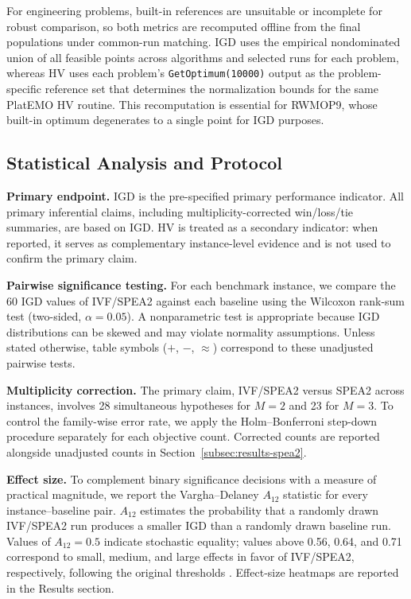 \documentclass[pdflatex,sn-mathphys-ay]{sn-jnl}%
\theoremstyle{thmstyleone}%
\theoremstyle{thmstyletwo}%
\theoremstyle{thmstylethree}%
\begin{document}
For engineering problems, built-in references are unsuitable or incomplete for robust comparison, so both metrics are recomputed offline from the final populations under common-run matching. IGD uses the empirical nondominated union of all feasible points across algorithms and selected runs for each problem, whereas HV uses each problem's \texttt{GetOptimum(10000)} output as the problem-specific reference set that determines the normalization bounds for the same PlatEMO HV routine. This recomputation is essential for RWMOP9, whose built-in optimum degenerates to a single point for IGD purposes.

\subsection{Statistical Analysis and Protocol}\label{subsec:stats}

\textbf{Primary endpoint.} IGD is the pre-specified primary performance indicator. All primary inferential claims, including multiplicity-corrected win/loss/tie summaries, are based on IGD. HV is treated as a secondary indicator: when reported, it serves as complementary instance-level evidence and is not used to confirm the primary claim.

\textbf{Pairwise significance testing.} For each benchmark instance, we compare the 60 IGD values of IVF/SPEA2 against each baseline using the Wilcoxon rank-sum test \citep{wilcoxon1945} (two-sided, $\alpha=0.05$). A nonparametric test is appropriate because IGD distributions can be skewed and may violate normality assumptions. Unless stated otherwise, table symbols ($+$, $-$, $\approx$) correspond to these unadjusted pairwise tests.

\textbf{Multiplicity correction.} The primary claim, IVF/SPEA2 versus SPEA2 across instances, involves 28 simultaneous hypotheses for $M=2$ and 23 for $M=3$. To control the family-wise error rate, we apply the Holm--Bonferroni step-down procedure \citep{holm1979simple} separately for each objective count. Corrected counts are reported alongside unadjusted counts in Section~\ref{subsec:results-spea2}.

\textbf{Effect size.} To complement binary significance decisions with a measure of practical magnitude, we report the Vargha--Delaney $A_{12}$ statistic \citep{vargha2000critique} for every instance--baseline pair. $A_{12}$ estimates the probability that a randomly drawn IVF/SPEA2 run produces a smaller IGD than a randomly drawn baseline run. Values of $A_{12}=0.5$ indicate stochastic equality; values above 0.56, 0.64, and 0.71 correspond to small, medium, and large effects in favor of IVF/SPEA2, respectively, following the original thresholds \citep{vargha2000critique}. Effect-size heatmaps are reported in the Results section.
\end{document}
